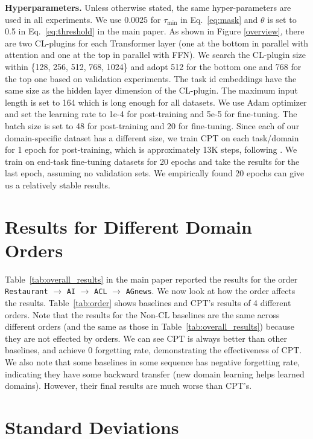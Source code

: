 \documentclass[11pt]{article}
\begin{document}
\textbf{Hyperparameters.}
Unless otherwise stated, the same hyper-parameters are used in all experiments.  We use $0.0025$ for $\tau_{\min}$ in Eq.~\ref{eq:mask} and $\theta$ is set to 0.5 in Eq.~\ref{eq:threshold} in the main paper. 
As shown in Figure \ref{overview}, there are two CL-plugins for each Transformer layer (one at the bottom in parallel with attention and one at the top in parallel with FFN). We search the CL-plugin size within \{128, 256, 512, 768, 1024\} and adopt 512 for the bottom one and 768 for the top one based on validation experiments. The task id embeddings have the same size as the hidden layer dimension of the CL-plugin.
The maximum input length is set to 164 which is long enough for all datasets. We use Adam optimizer and set the learning rate to 1e-4 for post-training and 5e-5 for fine-tuning. The batch size is set to 48 for post-training and 20 for fine-tuning. Since each of our domain-specific dataset has a different size, we train CPT on each task/domain for 1 epoch for post-training, which is approximately 13K steps, following \cite{DBLP:conf/acl/GururanganMSLBD20,DBLP:conf/naacl/XuLSY19}. We train on end-task fine-tuning datasets for 20 epochs and take the results for the last epoch, assuming no validation sets. We empirically found 20 epochs can give us a relatively stable results. 
\fi

\section{Results for Different Domain Orders}
\label{ap:order}

Table~\ref{tab:overall_results} in the main paper reported the results for the order \texttt{Restaurant} $\to$ \texttt{AI} $\to$ \texttt{ACL} $\to$ \texttt{AGnews}. We now look at how the order affects the results.
Table~\ref{tab:order} shows baselines and CPT's results of 4 different orders. Note that the results for the Non-CL baselines are the same across different orders (and the same as those in Table~\ref{tab:overall_results}) because they are not effected by orders. We can see CPT is always better than other baselines, and achieve 0 forgetting rate, demonstrating the effectiveness of CPT. We also note that some baselines in some sequence has negative forgetting rate, indicating they have some backward transfer (new domain learning helps learned domains). However, their final results are much worse than CPT's.

\section{Standard Deviations}
\label{ap:std}
\end{document}
